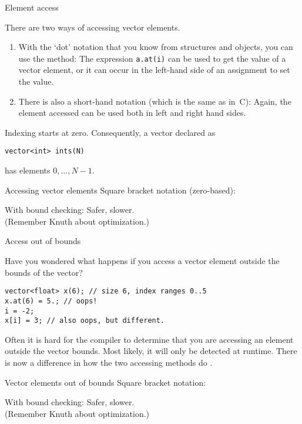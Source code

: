  {Element access}

There are two ways of accessing vector elements.
\begin{enumerate}
\item With the `dot' notation that you know from structures and objects, 
  you can use the  method:
  The expression \lstinline+a.at(i)+ can be used to get the value of a
  vector element, or it can occur in the left-hand side of an
  assignment to set the value.
\item
  There is also a short-hand notation (which is the same as in~C):
  Again, the element accessed can be used both in left and right hand sides.
\end{enumerate}

Indexing starts at zero. Consequently, a vector declared as
\begin{lstlisting}
vector<int> ints(N)
\end{lstlisting}
has elements $0,\ldots,N-1$.

\begin{slide}{Accessing vector elements}
  \label{sl:vectorsub}
  Square bracket notation (zero-based):

  With bound checking:
  Safer, slower.\\
  (Remember Knuth about optimization.)
\end{slide}

 {Access out of bounds}

Have you wondered what happens if you access a
vector element outside the bounds of the vector?
\begin{lstlisting}
vector<float> x(6); // size 6, index ranges 0..5
x.at(6) = 5.; // oops!
i = -2;
x[i] = 3; // also oops, but different.
\end{lstlisting}
Often it is hard for the compiler to determine that you are
accessing an element outside the vector bounds.
Most likely, it will only be detected at runtime.
There is now a difference in how the two accessing methods
do .

\begin{slide}{Vector elements out of bounds}
  \label{sl:vectorsuboob}
  Square bracket notation:

  With bound checking:
  Safer, slower.\\
  (Remember Knuth about optimization.)
\end{slide}

